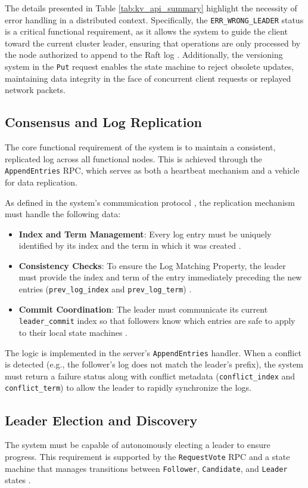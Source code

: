 The details presented in Table \ref{tab:kv_api_summary} highlight the necessity of error handling in a distributed context. Specifically, the \texttt{ERR\_WRONG\_LEADER} status is a critical functional requirement, as it allows the system to guide the client toward the current cluster leader, ensuring that operations are only processed by the node authorized to append to the Raft log \cite{1}. Additionally, the versioning system in the \texttt{Put} request enables the state machine to reject obsolete updates, maintaining data integrity in the face of concurrent client requests or replayed network packets.

\subsection{Consensus and Log Replication}
The core functional requirement of the system is to maintain a consistent, replicated log across all functional nodes. This is achieved through the \texttt{AppendEntries} RPC, which serves as both a heartbeat mechanism and a vehicle for data replication.

As defined in the system's communication protocol \cite{8}, the replication mechanism must handle the following data:
\begin{itemize}
    \item \textbf{Index and Term Management}: Every log entry must be uniquely identified by its index and the term in which it was created \cite{11}.
    \item \textbf{Consistency Checks}: To ensure the Log Matching Property, the leader must provide the index and term of the entry immediately preceding the new entries (\texttt{prev\_log\_index} and \texttt{prev\_log\_term}) \cite{12}.
    \item \textbf{Commit Coordination}: The leader must communicate its current \texttt{leader\_commit} index so that followers know which entries are safe to apply to their local state machines \cite{12}.
\end{itemize}

The logic is implemented in the server's \texttt{AppendEntries} handler. When a conflict is detected (e.g., the follower's log does not match the leader's prefix), the system must return a failure status along with conflict metadata (\texttt{conflict\_index} and \texttt{conflict\_term}) to allow the leader to rapidly synchronize the logs.

\subsection{Leader Election and Discovery}
The system must be capable of autonomously electing a leader to ensure progress. This requirement is supported by the \texttt{RequestVote} RPC and a state machine that manages transitions between \texttt{Follower}, \texttt{Candidate}, and \texttt{Leader} states \cite{raft_types}.

